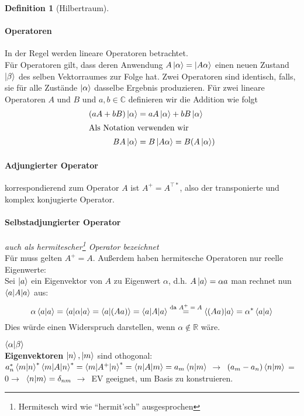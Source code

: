 \documentclass[oneside]{book}
\theoremstyle{definition}
\newtheorem*{definition*}{Definition}
\newcommand{\conseq}{$\rightarrow$~}
\renewcommand{\Re}{\mathbb{R}}
\newcommand{\Co}{\mathbb{C}}
\begin{document}
\begin{definition*}[Hilbertraum]
	\paragraph{Operatoren} In der Regel werden lineare Operatoren betrachtet.\\
	Für Operatoren gilt, dass deren Anwendung $A \ket{\alpha} = \ket{A \alpha}$ einen neuen Zustand $\ket{\beta}$ des selben Vektorraumes zur Folge hat. Zwei Operatoren sind identisch, falls, sie für alle Zustände $\ket{\alpha}$ dasselbe Ergebnis produzieren. Für zwei lineare Operatoren $A$ und $B$ und $a,b \in \Co$ definieren wir die Addition wie folgt
	\begin{align*}
		(a A + b B) \ket{\alpha} &= a A \ket{\alpha} + b B\ket{\alpha}\\
		\intertext{Als Notation verwenden wir}
		B A \ket{\alpha} &= B \ket{A \alpha} = B (A \ket{\alpha})
	\end{align*}
	
	\paragraph{Adjungierter Operator} korrespondierend zum Operator $A$ ist $A^+ = A^{\top \ast}$, also der transponierte und komplex konjugierte Operator.
	\paragraph{Selbstadjungierter Operator} \textit{auch als hermitescher\footnote{Hermitesch wird wie "`hermit'sch"' ausgesprochen} Operator bezeichnet}\\
	Für muss gelten $A^+ = A$. Außerdem haben hermitesche Operatoren nur reelle Eigenwerte:\\
	Sei $\ket a$ ein Eigenvektor von $A$ zu Eigenwert $\alpha$, d.h. $A \ket{a} = \alpha a$ man rechnet nun $\braket{a | A | a}$ aus:
	$$\alpha \braket{a | a} = \braket{a | \alpha | a} = \braket{a | (A a)} = \braket{a | A | a} \overset{\text{da $A^+ = A$}}{=} \braket{(A a) | a} = \alpha^\ast \braket{a | a}$$
	Dies würde einen Widerspruch darstellen, wenn $\alpha \notin \Re$ wäre.
\end{definition*}



$\braket{\alpha | \beta}$\\
\textbf{Eigenvektoren} $\ket{n}, \ket{m}$ sind othogonal:
$a_n^\ast \braket{m | n}^\ast \braket{m | A | n}^\ast = \braket{m | A^+ | n}^\ast = \braket{n | A | m} = a_m \braket{n | m}$
\conseq $(a_m - a_n) \braket{n | m}$ = 0\conseq $\braket{n | m} = \delta_{nm}$ \conseq EV geeignet, um Basis zu konstruieren.
\end{document}
